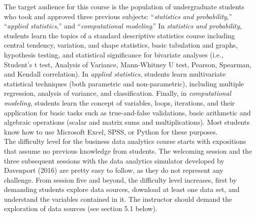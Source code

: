 \documentclass[letterpaper,11pt]{article}
\begin{document}
The target audience for this course is the population of undergraduate students who took and approved three previous subjects: ``\textit{statistics and probability},'' ``\textit{applied statistics},'' and ``\textit{computational modeling}.'' In \textit{statistics and probability}, students learn the topics of a standard descriptive statistics course including central tendency, variation, and shape statistics, basic tabulation and graphs, hypothesis testing, and statistical significance for bivariate analyses (i.e., Student's t test, Analysis of Variance, Mann-Whitney U test, Pearson, Spearman, and Kendall correlation). In \textit{applied statistics}, students learn multivariate statistical techniques (both parametric and non-parametric), including multiple regression, analysis of variance, and classification. Finally, in \textit{computational modeling}, students learn the concept of variables, loops, iterations, and their application for basic tasks such as true-and-false validations, basic arithmetic and algebraic operations (scalar and matrix sums and multiplications). Most students know how to use Microsoft Excel, SPSS, or Python for these purposes.\\
\vspace{0.3cm}
The difficulty level for the business data analytics course starts with expositions that assume no previous knowledge from students. The welcoming session and the three subsequent sessions with the data analytics simulator developed by Davenport (2016) are pretty easy to follow, as they do not represent any challenge. From session five and beyond, the difficulty level increases, first by demanding students explore data sources, download at least one data set, and understand the variables contained in it. The instructor should demand the exploration of data sources (see section 5.1 below). 
\end{document}

